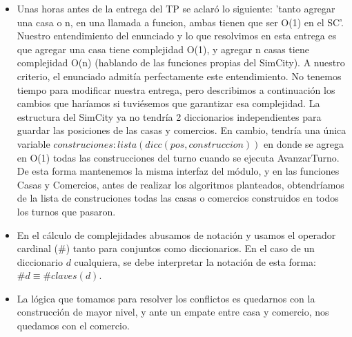 \begin{itemize}
    \item Unas horas antes de la entrega del TP se aclaró lo siguiente: 'tanto agregar una casa o n, en una llamada a funcion, ambas tienen que ser O(1) en el SC'. Nuestro entendimiento del enunciado y lo que resolvimos en esta entrega es que agregar una casa tiene complejidad O(1), y agregar n casas tiene complejidad O(n) (hablando de las funciones propias del SimCity). A nuestro criterio, el enunciado admitía perfectamente este entendimiento. No tenemos tiempo para modificar nuestra entrega, pero describimos a continuación los cambios que haríamos si tuviésemos que garantizar esa complejidad. La estructura del SimCity ya no tendría 2 diccionarios independientes para guardar las posiciones de las casas y comercios. En cambio, tendría una única variable $construciones: lista(dicc(pos, construccion))$ en donde se agrega en O(1) todas las construcciones del turno cuando se ejecuta AvanzarTurno. De esta forma mantenemos la misma interfaz del módulo, y en las funciones Casas y Comercios, antes de realizar los algoritmos planteados, obtendríamos de la lista de construciones todas las casas o comercios construidos en todos los turnos que pasaron.
    \item En el cálculo de complejidades abusamos de notación y usamos el operador cardinal ($\#$) tanto para conjuntos como diccionarios. En el caso de un diccionario $d$ cualquiera, se debe interpretar la notación de esta forma: $\#d \equiv \#claves(d)$.
    \item La lógica que tomamos para resolver los conflictos es quedarnos con la construcción de mayor nivel, y ante un empate entre casa y comercio, nos quedamos con el comercio.
\end{itemize}
